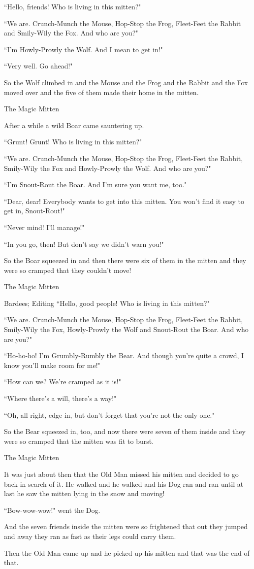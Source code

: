 \documentclass{article}
\begin{document}
``Hello, friends! Who is living in this mitten?"

``We are. Crunch-Munch the Mouse, Hop-Stop the Frog, Fleet-Feet the Rabbit and Smily-Wily the Fox. And who are you?"

``I'm Howly-Prowly the Wolf. And I mean to get in!"

``Very well. Go ahead!"

So the Wolf climbed in and the Mouse and the Frog and the Rabbit and the Fox moved over and the five of them made their home in the mitten.

The Magic Mitten

After a while a wild Boar came sauntering up.

``Grunt! Grunt! Who is living in this mitten?"

``We are. Crunch-Munch the Mouse, Hop-Stop the Frog, Fleet-Feet the Rabbit, Smily-Wily the Fox and Howly-Prowly the Wolf. And who are you?"

``I'm Snout-Rout the Boar. And I'm sure you want me, too."

``Dear, dear! Everybody wants to get into this mitten. You won't find it easy to get in, Snout-Rout!"

``Never mind! I'll manage!"

``In you go, then! But don't say we didn't warn you!"

So the Boar squeezed in and then there were six of them in the mitten and they were so cramped that they couldn't move!

The Magic Mitten

Bardees; Editing
``Hello, good people! Who is living in this mitten?"

``We are. Crunch-Munch the Mouse, Hop-Stop the Frog, Fleet-Feet the Rabbit, Smily-Wily the Fox, Howly-Prowly the Wolf and Snout-Rout the Boar. And who are you?"

``Ho-ho-ho! I'm Grumbly-Rumbly the Bear. And though you're quite a crowd, I know you'll make room for me!"

``How can we? We're cramped as it is!"

``Where there's a will, there's a way!"

``Oh, all right, edge in, but don't forget that you're not the only one."

So the Bear squeezed in, too, and now there were seven of them inside and they were so cramped that the mitten was fit to burst.

The Magic Mitten

It was just about then that the Old Man missed his mitten and decided to go back in search of it. He walked and he walked and his Dog ran and ran until at last he saw the mitten lying in the snow and moving!

``Bow-wow-wow!" went the Dog.

And the seven friends inside the mitten were so frightened that out they jumped and away they ran as fast as their legs could carry them.

Then the Old Man came up and he picked up his mitten and that was the end of that.
\end{document}
